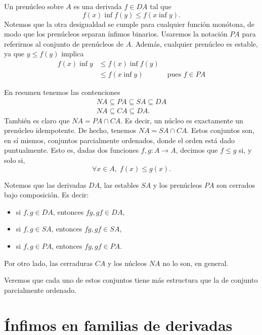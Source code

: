 \begin{defn}[Prenúcleos]
  Un prenúcleo sobre $A$ es una derivada $f\in DA$ tal que
  \[
    f(x)\inf f(y) \leq f(x\inf y)
  .\]
  Notemos que la otra desigualdad se cumple para cualquier
  función monótona, de modo que los prenúcleos separan ínfimos
  binarios.
  Usaremos la notación $PA$ para referirnos al conjunto de
  prenúcleos de $A$.
  Además, cualquier prenúcleo es estable, ya que $y\leq f(y)$ implica
  \begin{align*}
    f(x) \inf y
    &\leq f(x) \inf f(y) \\
    &\leq f(x\inf y) & \text{ pues $f\in PA$}
  \end{align*}
\end{defn}

En resumen tenemos las contenciones
\begin{align*}
  NA \subseteq PA \subseteq SA \subseteq DA \\
  NA \subseteq CA \subseteq DA.
\end{align*}
También es claro que $NA=PA\cap CA$. Es decir, un núcleo es
exactamente un prenúcleo idempotente.
De hecho, tenemos $NA=SA\cap CA$.
Estos conjuntos son, en sí mismos, conjuntos parcialmente
ordenados, donde el orden está dado puntualmente.
Esto es, dadas dos funciones $f,g:A\to A$, decimos que $f\leq g$
si, y solo si,
\[
  \forall x\in A,\; f(x)\leq g(x)
.\]

Notemos que las derivadas $DA$, las estables $SA$ y los
prenúcleos $PA$ son cerrados bajo composición.
Es decir:
\begin{itemize}
  \item si $f,g\in DA$, entonces $fg,gf\in DA$,
  \item si $f,g\in SA$, entonces $fg,gf\in SA$,
  \item si $f,g\in PA$, entonces $fg,gf\in PA$.
\end{itemize}
Por otro lado, las cerraduras $CA$ y los núcleos $NA$
no lo son, en general.

Veremos que cada uno de estos conjuntos tiene más
estructura que la de conjunto parcialmente ordenado.

\section{Ínfimos en familias de derivadas}

